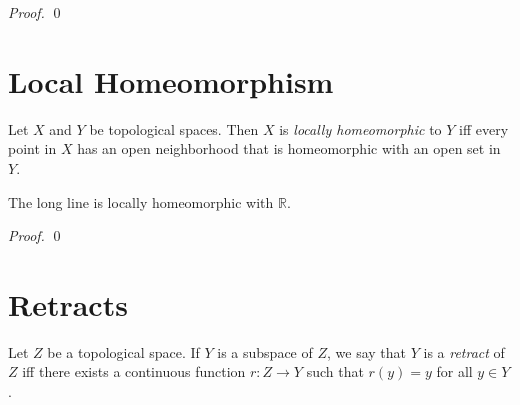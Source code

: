 \begin{proof}
  \pf
  \qed
\end{proof}

\section{Local Homeomorphism}

\begin{df}
  Let $X$ and $Y$ be topological spaces. Then $X$ is \emph{locally
    homeomorphic} to $Y$ iff every point in $X$ has an open neighborhood that
  is homeomorphic with an open set in $Y$.
\end{df}

\begin{prop}
  The long line is locally homeomorphic with $\mathbb{R}$.
\end{prop}

\begin{proof}
  \pf
  \qed
\end{proof}

\section{Retracts}

 \begin{df}[Retract]
Let $Z$ be a topological space. If $Y$ is a subspace of $Z$, we say that $Y$
is a \emph{retract} of $Z$ iff there exists a continuous function $r : Z
\rightarrow Y$ such that $r(y) = y$ for all $y \in Y$.
\end{df}

